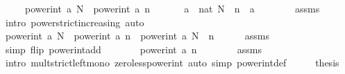 \begin{isabellebody}
\ \ \ \ \ {\isachardoublequoteopen}power{\isacharunderscore}{\kern0pt}int\ a\ N\ {\isachargreater}{\kern0pt}\ power{\isacharunderscore}{\kern0pt}int\ a\ n{\isachardoublequoteclose}\isanewline
%
\isadelimproof
%
\endisadelimproof
%
\isatagproof
{}\isamarkupfalse%
\ {\isacharminus}{\kern0pt}\isanewline
\ \ \isamarkupfalse%
\ {\isacharasterisk}{\kern0pt}{\isacharcolon}{\kern0pt}\ {\isachardoublequoteopen}a\ {\isacharcircum}{\kern0pt}\ nat\ {\isacharparenleft}{\kern0pt}N\ {\isacharminus}{\kern0pt}\ n{\isacharparenright}{\kern0pt}\ {\isachargreater}{\kern0pt}\ a\ {\isacharcircum}{\kern0pt}\ {}{\isachardoublequoteclose}\isanewline
\ \ \ \ \isamarkupfalse%
\ assms\ \isamarkupfalse%
\ {\isacharparenleft}{\kern0pt}intro\ power{\isacharunderscore}{\kern0pt}strict{\isacharunderscore}{\kern0pt}increasing{\isacharparenright}{\kern0pt}\ auto\isanewline
\ \ \isamarkupfalse%
\ {\isachardoublequoteopen}power{\isacharunderscore}{\kern0pt}int\ a\ N\ {\isacharequal}{\kern0pt}\ power{\isacharunderscore}{\kern0pt}int\ a\ n\ {\isacharasterisk}{\kern0pt}\ power{\isacharunderscore}{\kern0pt}int\ a\ {\isacharparenleft}{\kern0pt}N\ {\isacharminus}{\kern0pt}\ n{\isacharparenright}{\kern0pt}{\isachardoublequoteclose}\isanewline
\ \ \ \ \isamarkupfalse%
\ assms\ \isamarkupfalse%
\ {\isacharparenleft}{\kern0pt}simp\ flip{\isacharcolon}{\kern0pt}\ power{\isacharunderscore}{\kern0pt}int{\isacharunderscore}{\kern0pt}add{\isacharparenright}{\kern0pt}\isanewline
\ \ \isamarkupfalse%
\ \isamarkupfalse%
\ {\isachardoublequoteopen}{\isasymdots}\ {\isachargreater}{\kern0pt}\ power{\isacharunderscore}{\kern0pt}int\ a\ n\ {\isacharasterisk}{\kern0pt}\ {}{\isachardoublequoteclose}\isanewline
\ \ \ \ \isamarkupfalse%
\ assms\ {\isacharasterisk}{\kern0pt}\isanewline
\ \ \ \ \isamarkupfalse%
\ {\isacharparenleft}{\kern0pt}intro\ mult{\isacharunderscore}{\kern0pt}strict{\isacharunderscore}{\kern0pt}left{\isacharunderscore}{\kern0pt}mono\ zero{\isacharunderscore}{\kern0pt}less{\isacharunderscore}{\kern0pt}power{\isacharunderscore}{\kern0pt}int{\isacharparenright}{\kern0pt}\ {\isacharparenleft}{\kern0pt}auto\ simp{\isacharcolon}{\kern0pt}\ power{\isacharunderscore}{\kern0pt}int{\isacharunderscore}{\kern0pt}def{\isacharparenright}{\kern0pt}\isanewline
\ \ \isamarkupfalse%
\ \isamarkupfalse%
\ {\isacharquery}{\kern0pt}thesis\ \isamarkupfalse%

\end{isabellebody}
